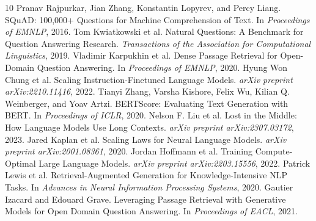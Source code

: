 \documentclass[a4paper,12pt]{article}
\begin{document}
\begin{thebibliography}{10}
 Pranav Rajpurkar, Jian Zhang, Konstantin Lopyrev, and Percy Liang. SQuAD: 100,000+ Questions for Machine Comprehension of Text. In \textit{Proceedings of EMNLP}, 2016.
 Tom Kwiatkowski et al. Natural Questions: A Benchmark for Question Answering Research. \textit{Transactions of the Association for Computational Linguistics}, 2019.
 Vladimir Karpukhin et al. Dense Passage Retrieval for Open-Domain Question Answering. In \textit{Proceedings of EMNLP}, 2020.
 Hyung Won Chung et al. Scaling Instruction-Finetuned Language Models. \textit{arXiv preprint arXiv:2210.11416}, 2022.
 Tianyi Zhang, Varsha Kishore, Felix Wu, Kilian Q. Weinberger, and Yoav Artzi. BERTScore: Evaluating Text Generation with BERT. In \textit{Proceedings of ICLR}, 2020.
 Nelson F. Liu et al. Lost in the Middle: How Language Models Use Long Contexts. \textit{arXiv preprint arXiv:2307.03172}, 2023.
 Jared Kaplan et al. Scaling Laws for Neural Language Models. \textit{arXiv preprint arXiv:2001.08361}, 2020.
 Jordan Hoffmann et al. Training Compute-Optimal Large Language Models. \textit{arXiv preprint arXiv:2203.15556}, 2022.
 Patrick Lewis et al. Retrieval-Augmented Generation for Knowledge-Intensive NLP Tasks. In \textit{Advances in Neural Information Processing Systems}, 2020.
 Gautier Izacard and Edouard Grave. Leveraging Passage Retrieval with Generative Models for Open Domain Question Answering. In \textit{Proceedings of EACL}, 2021.
\end{thebibliography}
\end{document}
